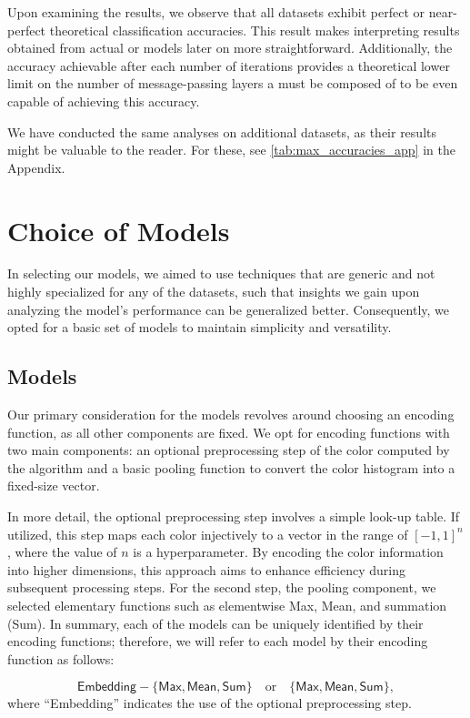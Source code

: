 Upon examining the results, we observe that all datasets exhibit perfect or near-perfect theoretical classification accuracies. This result makes interpreting results obtained from actual \wlnn or \gnn models later on more straightforward. Additionally, the accuracy achievable after each number of iterations provides a theoretical lower limit on the number of message-passing layers a \gnn must be composed of to be even capable of achieving this accuracy. 

We have conducted the same analyses on additional datasets, as their results might be valuable to the reader. For these, see \cref{tab:max_accuracies_app} in the Appendix.

\section{Choice of Models}
In selecting our models, we aimed to use techniques that are generic and not highly specialized for any of the datasets, such that insights we gain upon analyzing the model's performance can be generalized better. Consequently, we opted for a basic set of models to maintain simplicity and versatility.

\subsection{\wlnn Models}
Our primary consideration for the \wlnn models revolves around choosing an encoding function, as all other components are fixed. We opt for encoding functions with two main components: an optional preprocessing step of the color computed by the \wl algorithm and a basic pooling function to convert the color histogram into a fixed-size vector.

In more detail, the optional preprocessing step involves a simple look-up table. If utilized, this step maps each color injectively to a vector in the range of $[-1, 1]^n$, where the value of $n$ is a hyperparameter. By encoding the color information into higher dimensions, this approach aims to enhance efficiency during subsequent processing steps. For the second step, the pooling component, we selected elementary functions such as elementwise \textsf{Max}, \textsf{Mean}, and summation (\textsf{Sum}). In summary, each of the \wlnn models can be uniquely identified by their encoding functions; therefore, we will refer to each model by their encoding function as follows:


\begin{equation*}
	\textsf{Embedding}-\{\textsf{Max}, \textsf{Mean}, \textsf{Sum}\} \quad \text{or} \quad \{\textsf{Max}, \textsf{Mean}, \textsf{Sum}\},
\end{equation*}
where ``\textsf{Embedding}'' indicates the use of the optional preprocessing step.

